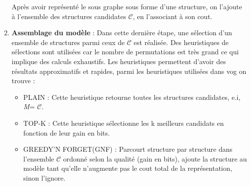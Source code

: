 \begin{enumerate}
\begin{enumerate}[label=\alph*]
  \end{enumerate} 
  
  
Après avoir représenté le sous graphe sous forme d'une structure, on l'ajoute à l'ensemble des structures candidates $\mathcal{C}$, en l'associant à son cout.

\item \textbf{Assemblage du modèle }: Dans cette dernière étape, une sélection d'un ensemble de structures parmi ceux de $\mathcal{C}$ est réalisée. Des heuristiques de sélections sont utilisées car le nombre de permutations est très grand ce qui implique des calculs exhaustifs. Les heuristiques permettent d'avoir des résultats approximatifs et rapides, parmi les heuristiques utilisées dans \gls{vog} on trouve :
\begin{itemize}
\item PLAIN : Cette heuristique retourne toutes les structures candidates, e.i, \textit{M}= $\mathcal{C}$.
\item TOP-K :  Cette heuristique sélectionne les k meilleurs candidats en fonction de leur gain en bits.
\item GREEDY'N FORGET(GNF) : Parcourt structure par structure dans l'ensemble $\mathcal{C}$ ordonné selon la qualité (gain en bits), ajoute la structure au modèle tant qu'elle n'augmente pas le cout total de la représentation, sinon l'ignore.
\end{itemize}  
\end{enumerate}







